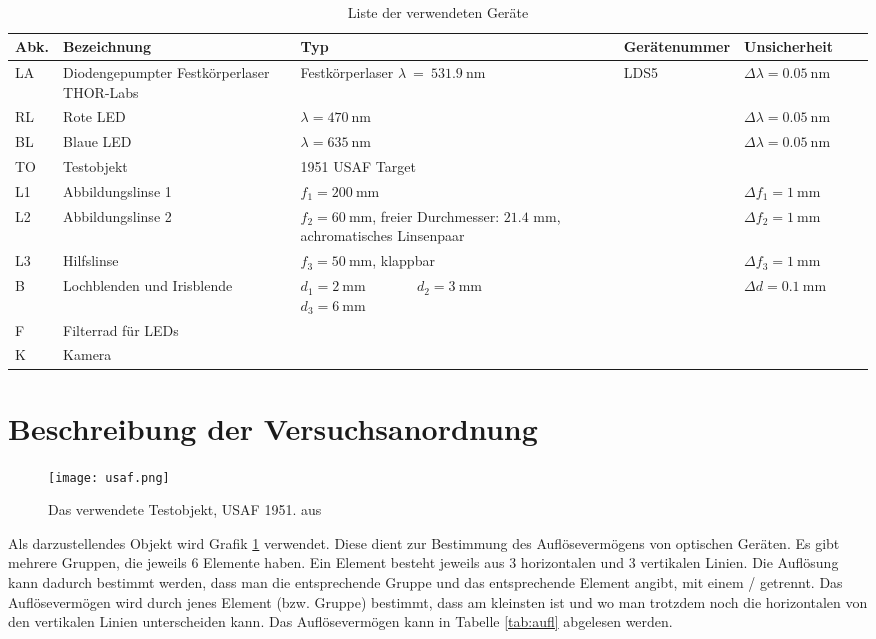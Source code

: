 \documentclass{article}
\begin{document}
\begin{table}[H]
\caption{Liste der verwendeten Geräte}

~

\begin{tabular}{l|p{3cm}p{3cm}llll}
Abk. & Bezeichnung  & Typ & Gerätenummer & Unsicherheit \\
\hline
LA & Diodenge\-pumpter Festkörperlaser THOR-Labs  & Festkörperlaser $\lambda~=~531.9~$nm & LDS5 & $\Delta \lambda = 0.05~$nm \\
\hline
RL & Rote LED &  $\lambda=470~$nm & & $\Delta \lambda = 0.05~$nm \\
\hline
BL & Blaue LED &  $\lambda=635~$nm & & $\Delta \lambda = 0.05~$nm \\
\hline
TO & Testobjekt & 1951 USAF Target  \\
\hline
L1 & Abbildungslinse 1 & $f_1 = 200~$mm & & $\Delta f_1 = 1~$mm \\
\hline
L2 & Abbildungslinse 2 & $f_2= 60~$mm, freier Durchmesser: $21.4$ mm, achromatisches Linsenpaar & & $\Delta f_2 = 1~$mm\\
\hline
L3 & Hilfslinse & $f_3 = 50~$mm, klappbar & & $\Delta f_3 = 1~$mm \\
\hline
B & Lochblenden und Irisblende & $d_1=2~$mm ~ ~ ~ ~ $d_2=3~$mm   ~~~~~~~~~~~~ $d_3=6~$mm & &  $\Delta d = 0.1~$mm \\
\hline
F & Filterrad für LEDs & \\
\hline
K & Kamera
\end{tabular}

\end{table}



\section{Beschreibung der Versuchsanordnung}


\begin{figure}[H]
\caption{Das verwendete Testobjekt, USAF 1951. aus \cite{quelle6}}
\label{fig:usaf}
{\centering
\texttt{[image: usaf.png]}
~
}
\end{figure}


Als darzustellendes Objekt wird Grafik \ref{fig:usaf} verwendet. Diese dient zur Bestimmung des Auflösevermögens von optischen Geräten. Es gibt mehrere Gruppen, die jeweils 6 Elemente haben. Ein Element besteht jeweils aus 3 horizontalen und 3 vertikalen Linien. Die Auflösung kann dadurch bestimmt werden, dass man die entsprechende Gruppe und das entsprechende Element angibt, mit einem / getrennt. Das Auflösevermögen wird durch jenes Element (bzw. Gruppe) bestimmt, dass am kleinsten ist und wo man trotzdem noch die horizontalen von den vertikalen Linien unterscheiden kann. Das Auflösevermögen kann in Tabelle \ref{tab:aufl} abgelesen werden.
\end{document}
